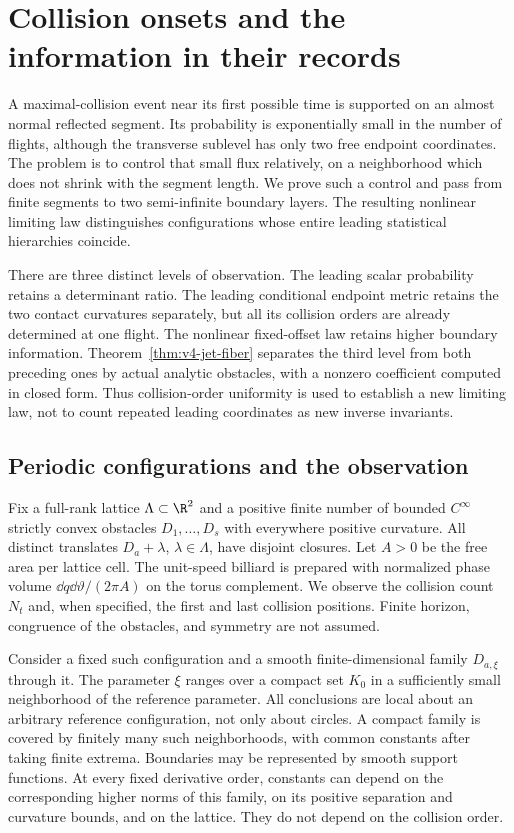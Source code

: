 \section{Collision onsets and the information in their records}
\label{sec:geometric-results}
A maximal-collision event near its first possible time is supported on
an almost normal reflected segment. Its probability is exponentially
small in the number of flights, although the transverse sublevel has
only two free endpoint coordinates. The problem is to control that small
flux relatively, on a neighborhood which does not shrink with the
segment length. We prove such a control and pass from finite segments
to two semi-infinite boundary layers. The resulting nonlinear limiting
law distinguishes configurations whose entire leading statistical
hierarchies coincide.

There are three distinct levels of observation. The leading scalar
probability retains a determinant ratio. The leading conditional
endpoint metric retains the two contact curvatures separately, but all
its collision orders are already determined at one flight. The nonlinear
fixed-offset law retains higher boundary information. Theorem~\ref{thm:v4-jet-fiber}
separates the third level from both preceding ones by actual analytic
obstacles, with a nonzero coefficient computed in closed form. Thus
collision-order uniformity is used to establish a new limiting law,
not to count repeated leading coordinates as new inverse invariants.

\subsection{Periodic configurations and the observation}
Fix a full-rank lattice $\Lambda\subset\R^2$ and a positive finite number of bounded
$C^\infty$ strictly convex obstacles $D_1,\ldots,D_s$ with everywhere
positive curvature. All distinct translates $D_a+\lambda$, $\lambda\in
\Lambda$, have disjoint closures. Let $A>0$ be the free area per lattice
cell. The unit-speed billiard is prepared with normalized phase volume
$\dd q\dd\vartheta/(2\pi A)$ on the torus complement. We observe the
collision count $N_t$ and, when specified, the first and last collision
positions. Finite horizon, congruence of the obstacles, and symmetry
are not assumed.

Consider a fixed such configuration and a smooth finite-dimensional
family $D_{a,\xi}$ through it. The parameter $\xi$ ranges over a compact
set $K_0$ in a sufficiently small neighborhood of the reference parameter.
All conclusions are local about an arbitrary reference configuration,
not only about circles. A compact family is covered by finitely many
such neighborhoods, with common constants after taking finite extrema.
Boundaries may be represented by smooth support functions. At every
fixed derivative order, constants can depend on the corresponding
higher norms of this family, on its positive separation and curvature
bounds, and on the lattice. They do not depend on the collision order.

